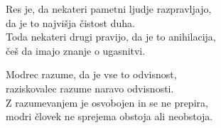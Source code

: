 \clearpage

Res je, da nekateri pametni ljudje razpravljajo,\\
da je to najvišja čistost duha.\\
Toda nekateri drugi pravijo, da je to anihilacija,\\
češ da imajo znanje o ugasnitvi.

Modrec razume, da je vse to odvisnost,\\
raziskovalec razume naravo odvisnosti.\\
Z razumevanjem je osvobojen in se ne prepira,\\
modri človek ne sprejema obstoja ali neobstoja.

